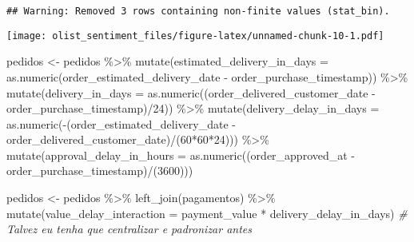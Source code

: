 \documentclass[
]{article}
\newenvironment{Shaded}{\begin{snugshade}}{\end{snugshade}}
\newcommand{\AttributeTok}[1]{\textcolor[rgb]{0.77,0.63,0.00}{#1}}
\newcommand{\CommentTok}[1]{\textcolor[rgb]{0.56,0.35,0.01}{\textit{#1}}}
\newcommand{\DecValTok}[1]{\textcolor[rgb]{0.00,0.00,0.81}{#1}}
\newcommand{\FunctionTok}[1]{\textcolor[rgb]{0.00,0.00,0.00}{#1}}
\newcommand{\NormalTok}[1]{#1}
\newcommand{\OtherTok}[1]{\textcolor[rgb]{0.56,0.35,0.01}{#1}}
\newcommand{\SpecialCharTok}[1]{\textcolor[rgb]{0.00,0.00,0.00}{#1}}
\begin{document}
\begin{verbatim}
## Warning: Removed 3 rows containing non-finite values (stat_bin).
\end{verbatim}

\texttt{[image: olist\_sentiment\_files/figure-latex/unnamed-chunk-10-1.pdf]}

\begin{Shaded}
\begin{Highlighting}[]
\NormalTok{pedidos }\OtherTok{\textless{}{-}}\NormalTok{ pedidos }\SpecialCharTok{\%\textgreater{}\%}
  \FunctionTok{mutate}\NormalTok{(}\AttributeTok{estimated\_delivery\_in\_days =} 
           \FunctionTok{as.numeric}\NormalTok{(order\_estimated\_delivery\_date }\SpecialCharTok{{-}}\NormalTok{ order\_purchase\_timestamp)) }\SpecialCharTok{\%\textgreater{}\%}
  \FunctionTok{mutate}\NormalTok{(}\AttributeTok{delivery\_in\_days =} 
           \FunctionTok{as.numeric}\NormalTok{((order\_delivered\_customer\_date }\SpecialCharTok{{-}}\NormalTok{ order\_purchase\_timestamp)}\SpecialCharTok{/}\DecValTok{24}\NormalTok{)) }\SpecialCharTok{\%\textgreater{}\%}
  \FunctionTok{mutate}\NormalTok{(}\AttributeTok{delivery\_delay\_in\_days =} 
           \FunctionTok{as.numeric}\NormalTok{(}\SpecialCharTok{{-}}\NormalTok{(order\_estimated\_delivery\_date }\SpecialCharTok{{-}}\NormalTok{ order\_delivered\_customer\_date)}\SpecialCharTok{/}\NormalTok{(}\DecValTok{60}\SpecialCharTok{*}\DecValTok{60}\SpecialCharTok{*}\DecValTok{24}\NormalTok{))) }\SpecialCharTok{\%\textgreater{}\%}
  \FunctionTok{mutate}\NormalTok{(}\AttributeTok{approval\_delay\_in\_hours =} \FunctionTok{as.numeric}\NormalTok{((order\_approved\_at }\SpecialCharTok{{-}}\NormalTok{ order\_purchase\_timestamp)}\SpecialCharTok{/}\NormalTok{(}\DecValTok{3600}\NormalTok{)))}
\end{Highlighting}
\end{Shaded}

\begin{Shaded}
\begin{Highlighting}[]
\NormalTok{pedidos }\OtherTok{\textless{}{-}}\NormalTok{ pedidos }\SpecialCharTok{\%\textgreater{}\%}
  \FunctionTok{left\_join}\NormalTok{(pagamentos) }\SpecialCharTok{\%\textgreater{}\%}
  \FunctionTok{mutate}\NormalTok{(}\AttributeTok{value\_delay\_interaction =}\NormalTok{ payment\_value }\SpecialCharTok{*}\NormalTok{ delivery\_delay\_in\_days) }\CommentTok{\# Talvez eu tenha que centralizar e padronizar antes}
\end{Highlighting}
\end{Shaded}
\end{document}
